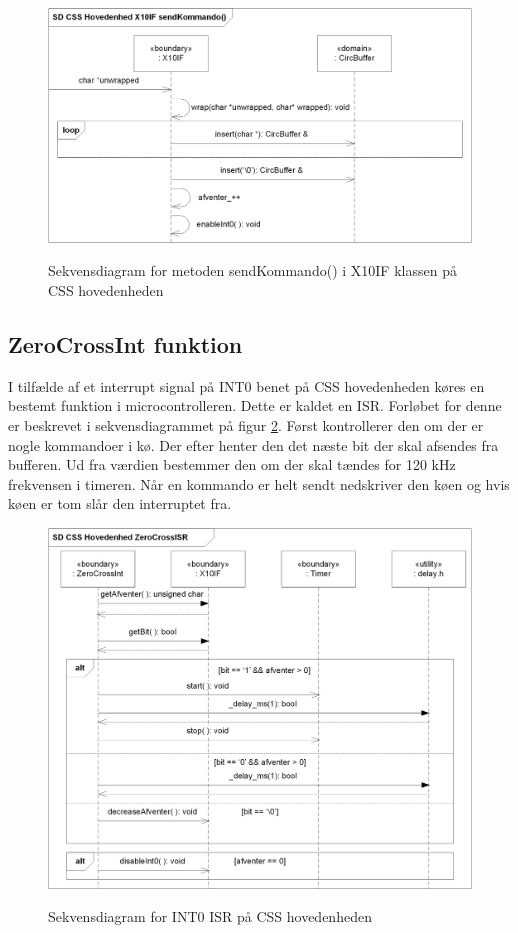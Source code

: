 \begin{figure}[!htb]
     {\includegraphics[width=\textwidth]{billeder/uml/CSS_X10IF_sendKommando_SD}}
     \caption{Sekvensdiagram for metoden sendKommando() i X10IF klassen på CSS hovedenheden}
     \label{fig:X10_sendKommando_sd}
\end{figure}

\subsection{ZeroCrossInt funktion}
I tilfælde af et interrupt signal på INT0 benet på CSS hovedenheden køres en bestemt funktion i microcontrolleren. Dette er kaldet en ISR. Forløbet for denne er beskrevet i sekvensdiagrammet på figur \ref{fig:ZeroCrossISR}.
Først kontrollerer den om der er nogle kommandoer i kø. Der efter henter den det næste bit der skal afsendes fra bufferen. Ud fra værdien bestemmer den om der skal tændes for 120 kHz frekvensen i timeren. Når en kommando er helt sendt nedskriver den køen og hvis køen er tom slår den interruptet fra.

\begin{figure}[!htb]
     {\includegraphics[width=\textwidth]{billeder/uml/CSS_ZeroCrossInt_SD}}
     \caption{Sekvensdiagram for INT0 ISR på CSS hovedenheden}
     \label{fig:ZeroCrossISR}
\end{figure}


